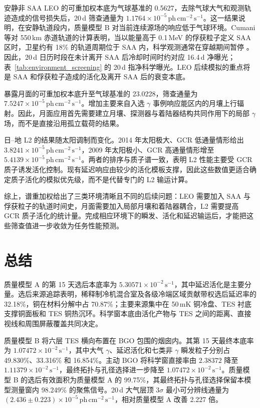 \documentclass[11pt]{article}
\newcommand{\revblue}[1]{\textcolor{revisionblue}{#1}}
\newcommand{\phcms}{\,\mathrm{ph\,cm^{-2}\,s^{-1}}}
\newcommand{\cps}{\,\mathrm{s^{-1}}}
\begin{document}
安静非 SAA LEO 的可重加权本底为气球基准的 0.5627，去除气球大气和观测轨迹造成的信号损失后，20\,d 筛查通量为 $1.1764\times10^{-5}\phcms$。这一结果说明，在安静轨道段内，质量模型 B 对当前连续源场的响应低于气球环境。Cumani 等对 550\,km 赤道轨道的计算表明，当以能量高于 0.1\,MeV 的俘获粒子定义 SAA 区时，卫星约有 18\% 的轨道周期位于 SAA 内，科学观测通常在穿越期间暂停 \cite{Cumani2019LEO}。因此，20\,d 日历时段在未计离开 SAA 后冷却时间时约对应 16.4\,d 净曝光；表~\ref{tab:environment_screening} 的 20\,d 指净科学曝光。LEO 后续模拟的重点将是 SAA 和俘获粒子造成的活化及离开 SAA 后的衰变本底。

暴露月面的可重加权本底升至气球基准的 23.0228，筛查通量为 $7.5247\times10^{-5}\phcms$。增加主要来自入选 $\gamma$ 事例响应能区内的月壤上行辐射。因此，月面应用首先需要建立月壤、探测器与着陆器结构共同作用下的局部 $\gamma$ 场，而不是直接沿用孤立载荷的结果。

日--地 L2 的结果随太阳调制而变化。2014 年太阳极大、GCR 低通量情形给出 $3.8241\times10^{-5}\phcms$，2009 年太阳极小、GCR 高通量情形增至 $5.4139\times10^{-5}\phcms$。两者的排序与质子谱一致，表明 L2 性能主要受 GCR 质子诱发活化控制。现有延迟响应由较少的活化模板支撑，因此这些数值更适合确定质子活化的模拟优先级，而不是代替专门的 L2 输运计算。

综上，谱重加权给出了三类环境清晰且不同的后续问题：LEO 需要加入 SAA 与俘获粒子的轨道时间史，月面需要加入局部月壤和着陆器耦合，L2 需要提高 GCR 质子活化的统计量。完成相应环境下的瞬发、活化和延迟输运后，才能把这些筛查值进一步收敛为任务性能预测。

\FloatBarrier

\section{总结}
\label{sec:summary}

质量模型 A 的第 15 天选后本底率为 $5.30571\times10^{-2}\cps$，其中延迟活化是主要分量。选后来源追踪表明，稀释制冷机混合室及各级冷端区域贡献带权选后延迟率的 32.18\%，铜在\revblue{材料分解中}占 70.87\%；主要来源集中在 50\,mK 铜冷盘、TES 衬底支撑铜面板和 TES 铜热沉环。\revblue{科学窗本底由活化产物与 TES 之间的距离、直接视线和周围屏蔽覆盖共同决定。}

质量模型 B 将六层 TES 横向布置在 BGO 包围的烟囱内。其第 15 天最终本底率为 $1.07472\times10^{-2}\cps$，其中\revblue{大气 $\gamma$}、延迟活化和七类非 $\gamma$ 瞬发粒子分别占 49.830\%、33.316\% 和 16.854\%。主动 BGO 将科学窗直接率由 $2.38372$ 降至 $1.11379\times10^{-2}\cps$，最终拓扑与孔径选择进一步降至 $1.07472\times10^{-2}\cps$。质量模型 B 的选后有效面积为质量模型 A 的 99.75\%，其最终拓扑与孔径选择保留本模型测量窗内 98.249\% 的聚焦信号。20\,d 大气层顶 $3\sigma$ 最小可分辨线通量为 $(2.436\pm0.223)\times10^{-5}\phcms$，相对质量模型 A 改善 2.227 倍。
\end{document}
